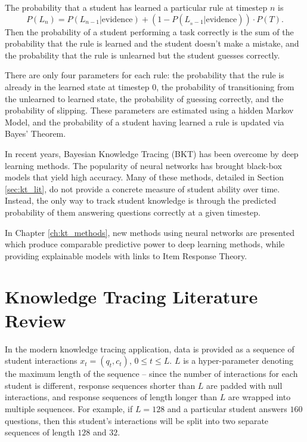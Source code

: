 The probability that a student has learned a particular rule at timestep $n$ is
\begin{equation}
P(L_n) = P(L_{n-1} | \text{evidence}) + (1 - P(L_{_n-1} | \text{evidence})) \cdot P(T).
\label{eq:kt}
\end{equation}
Then the probability of a student performing a task correctly is the sum of the probability that the rule is learned and the student doesn't make a mistake, and the probability that the rule is unlearned but the student guesses correctly.

There are only four parameters for each rule: the probability that the rule is already in the learned state at timestep 0, the probability of transitioning from the unlearned to learned state, the probability of guessing correctly, and the probability of slipping. These parameters are estimated using a hidden Markov Model, and the probability of a student having learned a rule is updated via Bayes' Theorem.

In recent years, Bayesian Knowledge Tracing (BKT) has been overcome by deep learning methods. The popularity of neural networks has brought black-box models that yield high accuracy. Many of these methods, detailed in Section \ref{sec:kt_lit}, do not provide a concrete measure of student ability over time. Instead, the only way to track student knowledge is through the predicted probability of them answering questions correctly at a given timestep. 

In Chapter \ref{ch:kt_methods}, new methods using neural networks are presented which produce comparable predictive power to deep learning methods, while providing explainable models with links to Item Response Theory.


\section*{Knowledge Tracing Literature Review}\label{sec:kt_lit}
In the modern knowledge tracing application, data is provided as a sequence of student interactions $x_t = (q_t, c_t)$, $0 \leq t \leq L$. $L$ is a hyper-parameter denoting the maximum length of the sequence -- since the number of interactions for each student is different, response sequences shorter than $L$ are padded with null interactions, and response sequences of length longer than $L$ are wrapped into multiple sequences. For example, if $L=128$ and a particular student answers $160$ questions, then this student's interactions will be split into two separate sequences of length $128$ and $32$.

